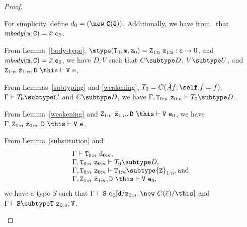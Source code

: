 \begin{proof}
\begin{itemize}
\begin{itemize}
            For simplicity, define $d_0 = (\new\ {\tt C}(\bar{\tt e}))$.
            Additionally, we have from \RInvk\ that
            ${\mathit{mbody}({\tt m},{\tt C})=\bar{x}. {\tt e}_0}$.

            From Lemma~\ref{body-type}, 
            $\mtype({\tt T}_0,{\tt m},{\tt z}_0) =
               \tt {\tt Z}_{1:n}\ {\tt z}_{1:n}:c \rightarrow {\tt U}$, and
            ${\mathit{mbody}({\tt m},{\tt C})=\bar{x}. {\tt e}_0}$,
            we have $D,V$ such that $C \subtype D$, $V \subtype U$, and
            ${\tt Z}_{1:n}\ \bar{\tt z}_{1:n},{\tt D}\ \this \vdash 
                  {\tt V}\ {\tt e}$.

            From Lemmas~\ref{subtyping} and \ref{weakening},
            $T_0 = C(\bar{A} \bar{f}; \self.\bar{f} = \bar{f}),$ 
            $\Gamma \vdash T_0 \subtype C$ and
            $C \subtype D$, 
            we have
            $\Gamma, {\tt T}_{0:n}\ {\tt z}_{0:n} \vdash T_0 \subtype D$.

            From Lemma~\ref{weakening} and
            ${\tt Z}_{1:n}\ \bar{\tt z}_{1:n},{\tt D}\ \this \vdash 
                  {\tt V}\ {\tt e}_0$, 
            we have
            $\Gamma, {\tt Z}_{1:n}\ \bar{\tt z}_{1:n},{\tt D}\ \this \vdash 
                  {\tt V}\ {\tt e}$.

            From Lemma~\ref{substitution} and
            $$
            \begin{array}{l}
            \Gamma \vdash {\tt T}_{0:n} \ {\tt d}_{0:n}, \\
            \Gamma,{\tt T}_{0:n}\ {\tt z}_{0:n} \vdash T_0 \subtype D, \\
            \Gamma, {\tt T}_{0:n}\ {\tt z}_{0:n} \vdash
                  {\tt T}_{1:n} \subtype {\tt Z}_{1:n}, \mbox{and}\\
            \Gamma, {\tt Z}_{1:n}\ \bar{\tt z}_{1:n},{\tt D}\ \this \vdash 
                    {\tt V}\ {\tt e}_0, \\
            \end{array}$$
            we have a type $S$ such that 
            $\Gamma \vdash {\tt S}\ 
                 {\tt e}_0[\bar{\tt d}/{\tt z}_{0:n},\new\ C(\bar{e})/\this]$ 
            and
            $\Gamma \vdash {\tt S} \subtype \bar{\tt T}\ {\tt z}_{0:n};{\tt V}$.


\end{itemize}
\end{itemize}
\end{proof}

